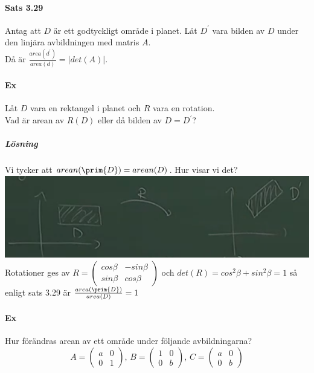 \paragraph{Sats 3.29} Antag att $D$ är ett godtyckligt område i planet.
Låt $D^{\prime}$ vara bilden av $D$ under den linjära avbildningen med matris $A$.\\
Då är $\frac{area(d^{\prime})}{area(d)}=|det(A)|$.
\\
\paragraph{Ex} Låt $D$ vara en rektangel i planet och $R$ vara en rotation.\\
Vad är arean av $R(D)$ eller då bilden av $D=D^{\prime}$?
\subparagraph{Lösning} Vi tycker att $arean(\prim{D})=arean(D)$.
Hur visar vi det?\\
\includegraphics[scale=0.5]{imgs/img04.png}\\
Rotationer ges av $R=\begin{pmatrix}
    cos\beta&-sin\beta\\
    sin\beta&cos\beta
\end{pmatrix}$ och $det(R)=cos^{2}\beta+sin^{2}\beta=1$ så enligt sats 3.29 är $\frac{area(\prim{D})}{area(D)}=1$

\clearpage

\paragraph{Ex} Hur förändras arean av ett område under följande avbildningarna?
\begin{equation*}
    A=\begin{pmatrix}a&0\\0&1\end{pmatrix}\text{, }B=\begin{pmatrix}1&0\\0&b\end{pmatrix}\text{, }C=\begin{pmatrix}a&0\\0&b\end{pmatrix}
\end{equation*}

